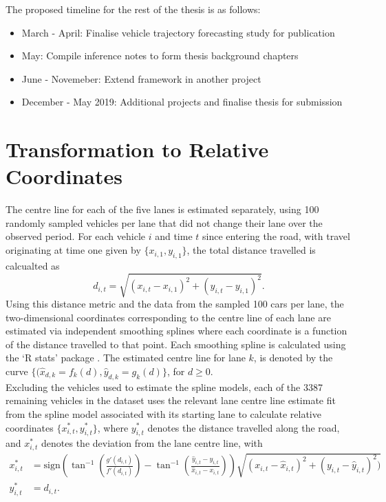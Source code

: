 \documentclass[12pt,a4paper]{article}\usepackage[]{graphicx}\usepackage[]{color}
\begin{document}
{The proposed timeline for the rest of the thesis is as follows:
\begin{itemize}
\item March - April: Finalise vehicle trajectory forecasting study for publication
\item May: Compile inference notes to form thesis background chapters
\item June - Novemeber: Extend framework in another project
\item December - May 2019: Additional projects and finalise thesis for submission
\end{itemize}


\newpage



\appendix
\section{Transformation to Relative Coordinates}

The centre line for each of the five lanes is estimated separately, using 100 randomly sampled vehicles per lane that did not change their lane over the observed period. 
For each vehicle $i$ and time $t$ since entering the road, with travel originating at time one given by $\{x_{i,1}, y_{i,1}\}$, the total distance travelled is calcualted as 
\begin{equation}
\label{distance}
d_{i, t} = \sqrt{(x_{i, t} - x_{i, 1})^2 + (y_{i, t} - y_{i, 1})^2}.
\end{equation}
Using this distance metric and the data from the sampled 100 cars per lane, the two-dimensional coordinates corresponding to the centre line of each lane are estimated via independent smoothing splines where each coordinate is a function of the distance travelled to that point. Each smoothing spline is calculated using the `R stats' package \citep{R}. The estimated centre line for lane $k$, is denoted by the curve $\{(\hat{x}_{d,k} = f_k(d), \hat{y}_{d,k} = g_k(d)\}$, for $d \geq 0$.
\\

Excluding the vehicles used to estimate the spline models, each of the 3387 remaining vehicles in the dataset uses the relevant lane centre line estimate fit from the spline model associated with its starting lane to calculate relative coordinates $\{x^*_{i, t}, y^*_{i, t}\}$, where $y^*_{i, t}$ denotes the distance travelled along the road, and $x^*_{i, t}$ denotes the deviation from the lane centre line, with
\begin{align}
x^*_{i, t} &= \mbox{sign}\left(\tan^{-1}\left(\frac{g'(d_{i, t}) }{f'(d_{i, t})}\right) - \tan^{-1}\left(\frac{\hat{y}_{i, t} - y_{i, t}}{\hat{x}_{i, t} - x_{i, t}} \right)\right)\sqrt{(x_{i, t}-\hat{x}_{i, t})^2 + (y_{i, t} - \hat{y}_{i, t})^2)} \label{xRel} \\
y^*_{i, t} &= d_{i, t}. \label{yRel}
\end{align}
\\

}
\end{document}
